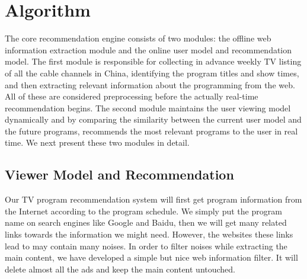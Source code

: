 \section{Algorithm}
\label{sec:algo}
The core recommendation engine consists of two modules:
the offline web information extraction module and the online
user model and recommendation model. The first module is responsible
for collecting in advance weekly TV listing of all the cable channels in China,
identifying the program titles and show times, and then extracting relevant
information about the programming from the web. All of these are
considered preprocessing before the actually real-time recommendation
begins. The second module maintains the user viewing model dynamically
and by comparing the similarity between the current user model and the future
programs, recommends the most relevant programs to the user in real time.
We next present these two modules in detail.
%
%

\subsection{Viewer Model and Recommendation}

Our TV program recommendation system will first get program information from the Internet according to the program schedule. We simply put the program name on search engines like  Google and Baidu, then we will get many related links towards the information we might need. However, the websites these links lead to may contain many noises. In order to filter noises while extracting the main content, we have developed a simple but nice web information filter. It will delete almost all the ads and keep the main content untouched.


